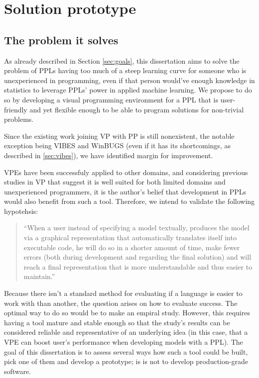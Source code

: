 \chapter{Solution prototype}\label{chap:chap3}


\section{The problem it solves}

As already described in Section \ref{sec:goals}, this dissertation aims to solve
the problem of PPLs having too much of a steep learning curve for someone who
is unexperienced in programming, even if that person would've enough knowledge
in statistics to leverage PPLs' power in applied machine learning. We propose
to do so by developing a visual programming environment for a PPL that is user-friendly
and yet flexible enough to be able to program solutions for non-trivial problems.

Since the existing work joining VP with PP is still nonexistent, the notable exception
being VIBES and WinBUGS (even if it has its shortcomings, as described in \ref{sec:vibes}),
we have identified margin for improvement.

VPEs have been successfuly
applied to other domains, and considering previous studies in VP that suggest it is
well suited for both limited domains and unexperienced programmers, it is the
author's belief that development in PPLs would also benefit from such a tool.
Therefore, we intend to validate the following hypotehsis:

\begin{quote}
  ``When a user instead of specifying a model textually,
  produces the model via a graphical representation that automatically translates
  itself into executable code, he will do so in a shorter amount of time, make
  fewer errors (both during development and regarding the final solution) and
  will reach a final representation that is more understandable and thus
  easier to maintain.''
\end{quote}

Because there isn't a standard method for evaluating if a language is easier
to work with than another, the question arises on how to evaluate success.
The optimal way to do so would be to make an empiral
study. However, this requires having a tool mature and stable enough so that the
study's results can be considered reliable and representative of an underlying
idea (in this case, that a VPE can boost user's performance when developing
models with a PPL). The goal of this dissertation is to
assess several ways how such a tool could be built, pick one of them and develop
a prototype; is is not to develop production-grade software.

